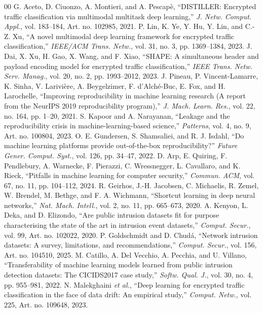\documentclass[journal]{IEEEtran}
\begin{document}
\begin{thebibliography}{00}
 G. Aceto, D. Ciuonzo, A. Montieri, and A. Pescap\`e, ``DISTILLER: Encrypted traffic classification via multimodal multitask deep learning,'' \emph{J. Netw. Comput. Appl.}, vol. 183--184, Art. no. 102985, 2021.
 P. Lin, K. Ye, Y. Hu, Y. Lin, and C.-Z. Xu, ``A novel multimodal deep learning framework for encrypted traffic classification,'' \emph{IEEE/ACM Trans. Netw.}, vol. 31, no. 3, pp. 1369--1384, 2023.
 J. Dai, X. Xu, H. Gao, X. Wang, and F. Xiao, ``SHAPE: A simultaneous header and payload encoding model for encrypted traffic classification,'' \emph{IEEE Trans. Netw. Serv. Manag.}, vol. 20, no. 2, pp. 1993--2012, 2023.
 J. Pineau, P. Vincent-Lamarre, K. Sinha, V. Larivi\`ere, A. Beygelzimer, F. d'Alch\'e-Buc, E. Fox, and H. Larochelle, ``Improving reproducibility in machine learning research (A report from the NeurIPS 2019 reproducibility program),'' \emph{J. Mach. Learn. Res.}, vol. 22, no. 164, pp. 1--20, 2021.
 S. Kapoor and A. Narayanan, ``Leakage and the reproducibility crisis in machine-learning-based science,'' \emph{Patterns}, vol. 4, no. 9, Art. no. 100804, 2023.
 O. E. Gundersen, S. Shamsaliei, and R. J. Isdahl, ``Do machine learning platforms provide out-of-the-box reproducibility?'' \emph{Future Gener. Comput. Syst.}, vol. 126, pp. 34--47, 2022.
 D. Arp, E. Quiring, F. Pendlebury, A. Warnecke, F. Pierazzi, C. Wressnegger, L. Cavallaro, and K. Rieck, ``Pitfalls in machine learning for computer security,'' \emph{Commun. ACM}, vol. 67, no. 11, pp. 104--112, 2024.
 R. Geirhos, J.-H. Jacobsen, C. Michaelis, R. Zemel, W. Brendel, M. Bethge, and F. A. Wichmann, ``Shortcut learning in deep neural networks,'' \emph{Nat. Mach. Intell.}, vol. 2, no. 11, pp. 665--673, 2020.
 A. Kenyon, L. Deka, and D. Elizondo, ``Are public intrusion datasets fit for purpose characterising the state of the art in intrusion event datasets,'' \emph{Comput. Secur.}, vol. 99, Art. no. 102022, 2020.
 P. Goldschmidt and D. Chud\'a, ``Network intrusion datasets: A survey, limitations, and recommendations,'' \emph{Comput. Secur.}, vol. 156, Art. no. 104510, 2025.
 M. Catillo, A. Del Vecchio, A. Pecchia, and U. Villano, ``Transferability of machine learning models learned from public intrusion detection datasets: The CICIDS2017 case study,'' \emph{Softw. Qual. J.}, vol. 30, no. 4, pp. 955--981, 2022.
 N. Malekghaini \emph{et al.}, ``Deep learning for encrypted traffic classification in the face of data drift: An empirical study,'' \emph{Comput. Netw.}, vol. 225, Art. no. 109648, 2023.

\end{thebibliography}
\end{document}
